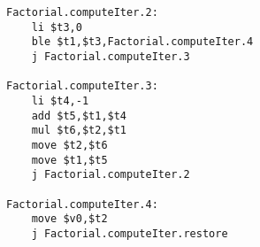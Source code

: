\documentclass[8pt,a4paper,compress]{beamer}
\begin{document}
\begin{frame}[fragile]
\pause

\begin{lstlisting}[language={},style=focusin]
Factorial.computeIter.2:
    li $t3,0                                                                                                                                                                                                                                  
    ble $t1,$t3,Factorial.computeIter.4
    j Factorial.computeIter.3

Factorial.computeIter.3:
    li $t4,-1                                                                                                                                                                                                                                 
    add $t5,$t1,$t4
    mul $t6,$t2,$t1                                                                                                                                                                                                                           
    move $t2,$t6                                                                                                                                                                                                                              
    move $t1,$t5                                                                                                                                                                                                                              
    j Factorial.computeIter.2                                                                                                                                                                                                                 
                                                                                                                                                                                                                                              
Factorial.computeIter.4:                                                                                                                                                                                                                      
    move $v0,$t2                                                                                                                                                                                                                              
    j Factorial.computeIter.restore                                                                                                                                                                                                           
                                                                                                                                                                                                                                              

\end{lstlisting}
\end{frame}
\end{document}
